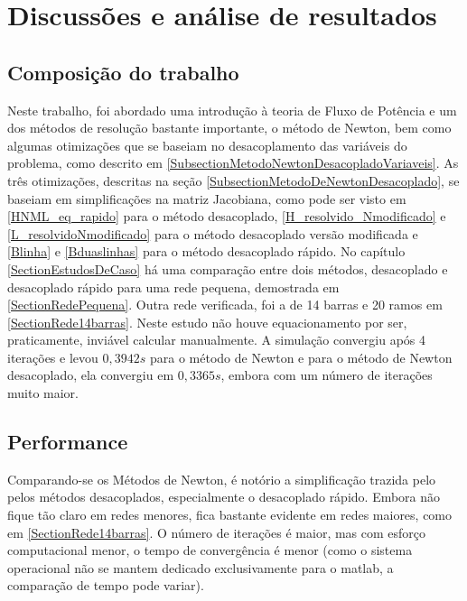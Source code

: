 \chapter{Discussões e an\'alise de resultados}
\section{Composição do trabalho}
Neste trabalho, foi abordado uma introdução à teoria de Fluxo de Potência e um dos métodos de resolução bastante importante, o método de Newton, bem como algumas otimizações que se baseiam no desacoplamento das variáveis do problema, como descrito em \ref{SubsectionMetodoNewtonDesacopladoVariaveis}. As três otimizações, descritas na seção \ref{SubsectionMetodoDeNewtonDesacoplado}, se baseiam em simplificações na matriz Jacobiana, como pode ser visto em \ref{HNML_eq_rapido} para o método desacoplado, \ref{H_resolvido_Nmodificado} e \ref{L_resolvidoNmodificado} para o método desacoplado versão modificada e \ref{Blinha} e \ref{Bduaslinhas} para o método desacoplado rápido. No capítulo \ref{SectionEstudosDeCaso} há uma comparação entre dois métodos, desacoplado e desacoplado rápido para uma rede pequena, demostrada em \ref{SectionRedePequena}. Outra rede verificada, foi a de 14 barras e 20 ramos em \ref{SectionRede14barras}. Neste estudo não houve equacionamento por ser, praticamente, inviável calcular manualmente. A simulação convergiu após 4 iterações e levou $0,3942s$ para o método de Newton e para o método de Newton desacoplado, ela convergiu em $0,3365s$, embora com um número de iterações muito maior.
\section{Performance}
Comparando-se os Métodos de Newton, é notório a simplificação trazida pelo pelos métodos desacoplados, especialmente o desacoplado rápido. Embora não fique tão claro em redes menores, fica bastante evidente em redes maiores, como em \ref{SectionRede14barras}. O número de iterações é maior, mas com esforço computacional menor, o tempo de convergência é menor (como o sistema operacional não se mantem dedicado exclusivamente para o matlab, a comparação de tempo pode variar).


